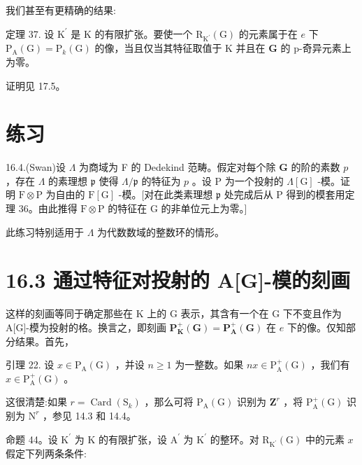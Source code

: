 \documentclass[10pt]{article}
\begin{document}
我们甚至有更精确的结果:

定理 37. 设 \({\mathrm{K}}^{\prime }\) 是 \(\mathrm{K}\) 的有限扩张。要使一个 \({\mathrm{R}}_{{\mathrm{K}}^{\prime }}\left( \mathrm{G}\right)\) 的元素属于在 \(e\) 下 \({\mathrm{P}}_{\mathrm{A}}\left( \mathrm{G}\right)  = {\mathrm{P}}_{k}\left( \mathrm{G}\right)\) 的像，当且仅当其特征取值于 \(\mathrm{K}\) 并且在 \(\mathbf{G}\) 的 p-奇异元素上为零。

证明见 17.5。

\section*{练习}

16.4.(Swan)设 \(\Lambda\) 为商域为 F 的 Dedekind 范畴。假定对每个除 \(\mathbf{G}\) 的阶的素数 \(p\) ，存在 \(\Lambda\) 的素理想 \(\mathfrak{p}\) 使得 \(\Lambda /\mathfrak{p}\) 的特征为 \(p\) 。设 \(\mathrm{P}\) 为一个投射的 \(\Lambda \left\lbrack  \mathrm{G}\right\rbrack\) -模。证明 \(\mathrm{F} \otimes  \mathrm{P}\) 为自由的 \(\mathrm{F}\left\lbrack  \mathrm{G}\right\rbrack\) -模。[对在此类素理想 \(\mathfrak{p}\) 处完成后从 \(\mathrm{P}\) 得到的模套用定理 36。由此推得 \(\mathrm{F} \otimes  \mathrm{P}\) 的特征在 \(\mathrm{G}\) 的非单位元上为零。]

此练习特别适用于 \(\Lambda\) 为代数数域的整数环的情形。

\section*{16.3 通过特征对投射的 A[G]-模的刻画}

这样的刻画等同于确定那些在 K 上的 G 表示，其含有一个在 G 下不变且作为 A[G]-模为投射的格。换言之，即刻画 \({\mathbf{P}}_{\mathbf{K}}^{ + }\left( \mathbf{G}\right)  = {\mathbf{P}}_{\mathbf{A}}^{ + }\left( \mathbf{G}\right)\) 在 \(e\) 下的像。仅知部分结果。首先，

引理 22. 设 \(x \in  {\mathrm{P}}_{\mathrm{A}}\left( \mathrm{G}\right)\) ，并设 \(n \geq  1\) 为一整数。如果 \({nx} \in  {\mathrm{P}}_{\mathrm{A}}^{ + }\left( \mathrm{G}\right)\) ，我们有 \(x \in  {\mathrm{P}}_{\mathrm{A}}^{ + }\left( \mathrm{G}\right)\) 。

这很清楚:如果 \(r = \operatorname{Card}\left( {\mathrm{S}}_{k}\right)\) ，那么可将 \({\mathrm{P}}_{\mathrm{A}}\left( \mathrm{G}\right)\) 识别为 \({\mathbf{Z}}^{r}\) ，将 \({\mathrm{P}}_{\mathrm{A}}^{ + }\left( \mathrm{G}\right)\) 识别为 \({\mathrm{N}}^{r}\) ，参见 14.3 和 14.4。

命题 44。设 \({\mathrm{K}}^{\prime }\) 为 \(\mathrm{K}\) 的有限扩张，设 \({\mathrm{A}}^{\prime }\) 为 \({\mathrm{K}}^{\prime }\) 的整环。对 \({\mathrm{R}}_{{\mathrm{K}}^{\prime }}\left( \mathrm{G}\right)\) 中的元素 \(x\) 假定下列两条条件:
\end{document}

